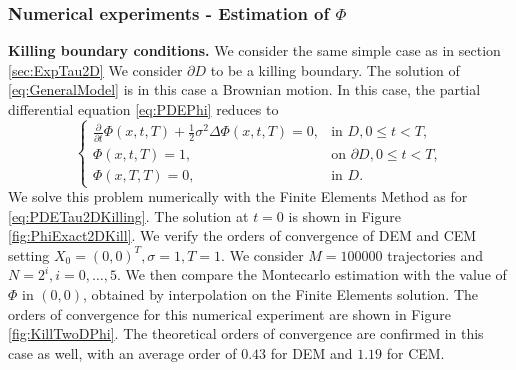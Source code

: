\subsubsection{Numerical experiments - Estimation of $\Phi$}

\textbf{Killing boundary conditions.} We consider the same simple case as in section \ref{sec:ExpTau2D} We consider $\partial D$ to be a killing boundary. The solution of \eqref{eq:GeneralModel} is in this case a Brownian motion. In this case, the partial differential equation \eqref{eq:PDEPhi} reduces to
\begin{equation}\label{eq:PDEPhi2DKilling}
\begin{cases}
	\frac{\partial}{\partial t} \Phi(x,t,T) + \frac{1}{2} \sigma^2 \Delta \Phi(x,t,T) = 0, & \text{in } D, 0 \leq t < T,\\
	\Phi(x,t,T) = 1, & \text{on } \partial D, 0 \leq t < T,\\
	\Phi(x,T,T) = 0, & \text{in } D.
\end{cases}
\end{equation}
We solve this problem numerically with the Finite Elements Method as for \eqref{eq:PDETau2DKilling}. The solution at $t = 0$ is shown in Figure \ref{fig:PhiExact2DKill}. We verify the orders of convergence of DEM and CEM setting $X_0 = (0,0)^T , \sigma = 1, T = 1$. We consider $M = 100000$ trajectories and $N = 2^i,i=0,\dots,5$. We then compare the Montecarlo estimation with the value of $\Phi$ in $(0,0)$, obtained by interpolation on the Finite Elements solution. The orders of convergence for this numerical experiment are shown in Figure \ref{fig:KillTwoDPhi}. The theoretical orders of convergence are confirmed in this case as well, with an average order of $0.43$ for DEM and $1.19$ for CEM.

